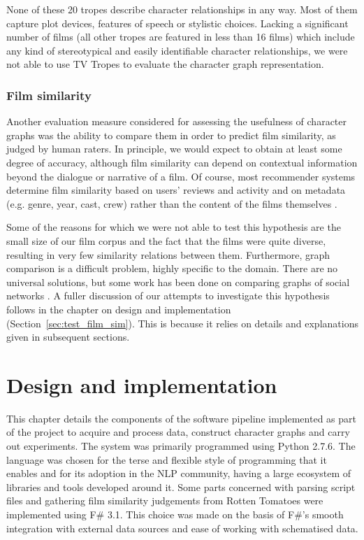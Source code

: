 \documentclass[bsc,frontabs,deptreport,singlespacing,parskip, twoside]{infthesis}
\begin{document}
None of these 20 tropes describe character relationships in any way. Most of them capture plot devices, features of speech or stylistic choices. Lacking a significant number of films (all other tropes are featured in less than 16 films) which include any kind of stereotypical and easily identifiable character relationships, we were not able to use TV Tropes to evaluate the character graph representation.

\subsection{Film similarity}
\label{sec:hyp_film_sim}
Another evaluation measure considered for assessing the usefulness of character graphs was the ability to compare them in order to predict film similarity, as judged by human raters. In principle, we would expect to obtain at least some degree of accuracy, although film similarity can depend on contextual information beyond the dialogue or narrative of a film. Of course, most recommender systems determine film similarity based on users' reviews and activity and on metadata (e.g. genre, year, cast, crew) rather than the content of the films themselves \cite{said2010putting}.

Some of the reasons for which we were not able to test this hypothesis are the small size of our film corpus and the fact that the films were quite diverse, resulting in very few similarity relations between them. Furthermore, graph comparison is a difficult problem, highly specific to the domain. There are no universal solutions, but some work has been done on comparing graphs of social networks \cite{macindoe2010graph}. A fuller discussion of our attempts to investigate this hypothesis follows in the chapter on design and implementation (Section~\ref{sec:test_film_sim}). This is because it relies on details and explanations given in subsequent sections.

\chapter{Design and implementation}
\label{chap:design}
This chapter details the components of the software pipeline implemented as part of the project to acquire and process data, construct character graphs and carry out experiments. The system was primarily programmed using Python 2.7.6. The language was chosen for the terse and flexible style of programming that it enables and for its adoption in the NLP community, having a large ecosystem of libraries and tools developed around it. Some parts concerned with parsing script files and gathering film similarity judgements from Rotten Tomatoes were implemented using F\# 3.1. This choice was made on the basis of F\#'s smooth integration with external data sources and ease of working with schematised data.
\end{document}

